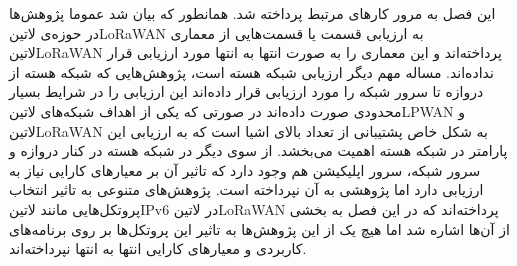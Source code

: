 


%
%

%



این فصل به مرور کارهای مرتبط پرداخته شد. همانطور که بیان شد عموما پژوهش‌ها در حوزه‌ی ‌لاتین{LoRaWAN} به ارزیابی قسمت یا قسمت‌هایی از معماری ‌لاتین{LoRaWAN}
پرداخته‌اند و این معماری را به صورت انتها به انتها مورد ارزیابی قرار نداده‌اند.
مساله مهم دیگر ارزیابی شبکه هسته است، پژوهش‌هایی که شبکه هسته از دروازه تا سرور شبکه را مورد ارزیابی قرار داده‌اند این ارزیابی را در شرایط بسیار محدودی صورت داده‌اند در صورتی
که یکی از اهداف شبکه‌های ‌لاتین{LPWAN} و ‌لاتین{LoRaWAN} به شکل خاص پشتیبانی از تعداد بالای اشیا است که به ارزیابی این پارامتر در شبکه هسته اهمیت می‌بخشد.
از سوی دیگر در شبکه هسته در کنار دروازه و سرور شبکه، سرور اپلیکیشن هم وجود دارد که تاثیر آن بر معیارهای کارایی نیاز به ارزیابی دارد اما پژوهشی به آن نپرداخته است.
پژوهش‌های متنوعی به تاثیر انتخاب پروتکل‌هایی مانند ‌لاتین{IPv6} در ‌لاتین{LoRaWAN} پرداخته‌اند که در این فصل به بخشی از آن‌ها اشاره شد اما هیچ یک از این پژوهش‌ها
به تاثیر این پروتکل‌ها بر روی برنامه‌های کاربردی و معیارهای کارایی انتها به انتها نپرداخته‌اند.
